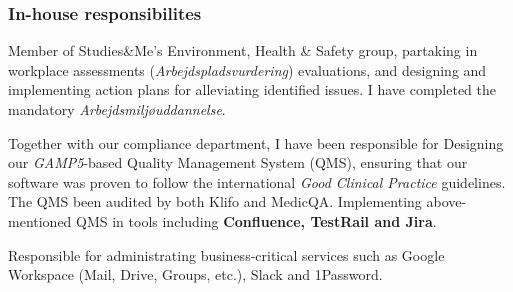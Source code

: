 \documentclass[10pt, a4paper]{article}
\newcommand{\sme}{Studies\&Me}
\begin{document}
\subsubsection*{In-house responsibilites}
\begin{outline}
  \1 Member of \sme's Environment, Health \& Safety group, partaking in workplace assessments (\textit{Arbejdspladsvurdering}) evaluations, and designing and implementing action plans for alleviating identified issues. I have completed the mandatory \textit{Arbejdsmiljøuddannelse}.

\1 Together with our compliance department, I have been responsible for
  \2 Designing our \textit{GAMP5}-based Quality Management System (QMS), ensuring that our software was proven to follow the international \textit{Good Clinical Practice} guidelines. The QMS been audited by both Klifo and MedicQA.
  \2 Implementing above-mentioned QMS in tools including \textbf{Confluence, TestRail and Jira}.

\1 Responsible for administrating business-critical services such as Google Workspace (Mail, Drive, Groups, etc.), Slack and 1Password.
\end{outline}
\pagebreak
\end{document}
